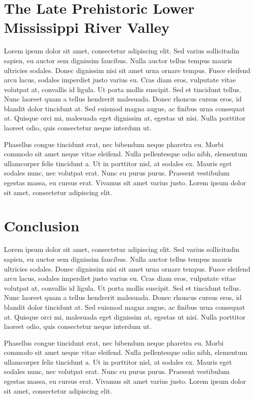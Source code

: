 \documentclass[article]{jss}
\begin{document}
\section{The Late Prehistoric Lower Mississippi River
Valley}\label{the-late-prehistoric-lower-mississippi-river-valley}

Lorem ipsum dolor sit amet, consectetur adipiscing elit. Sed varius
sollicitudin sapien, eu auctor sem dignissim faucibus. Nulla auctor
tellus tempus mauris ultricies sodales. Donec dignissim nisi sit amet
urna ornare tempus. Fusce eleifend arcu lacus, sodales imperdiet justo
varius eu. Cras diam eros, vulputate vitae volutpat at, convallis id
ligula. Ut porta mollis suscipit. Sed et tincidunt tellus. Nunc laoreet
quam a tellus hendrerit malesuada. Donec rhoncus cursus eros, id blandit
dolor tincidunt at. Sed euismod magna augue, ac finibus urna consequat
at. Quisque orci mi, malesuada eget dignissim at, egestas ut nisi. Nulla
porttitor laoreet odio, quis consectetur neque interdum ut.

Phasellus congue tincidunt erat, nec bibendum neque pharetra eu. Morbi
commodo sit amet neque vitae eleifend. Nulla pellentesque odio nibh,
elementum ullamcorper felis tincidunt a. Ut in porttitor nisl, at
sodales ex. Mauris eget sodales nunc, nec volutpat erat. Nunc eu purus
purus. Praesent vestibulum egestas massa, eu cursus erat. Vivamus sit
amet varius justo. Lorem ipsum dolor sit amet, consectetur adipiscing
elit.

\section{Conclusion}\label{conclusion}

Lorem ipsum dolor sit amet, consectetur adipiscing elit. Sed varius
sollicitudin sapien, eu auctor sem dignissim faucibus. Nulla auctor
tellus tempus mauris ultricies sodales. Donec dignissim nisi sit amet
urna ornare tempus. Fusce eleifend arcu lacus, sodales imperdiet justo
varius eu. Cras diam eros, vulputate vitae volutpat at, convallis id
ligula. Ut porta mollis suscipit. Sed et tincidunt tellus. Nunc laoreet
quam a tellus hendrerit malesuada. Donec rhoncus cursus eros, id blandit
dolor tincidunt at. Sed euismod magna augue, ac finibus urna consequat
at. Quisque orci mi, malesuada eget dignissim at, egestas ut nisi. Nulla
porttitor laoreet odio, quis consectetur neque interdum ut.

Phasellus congue tincidunt erat, nec bibendum neque pharetra eu. Morbi
commodo sit amet neque vitae eleifend. Nulla pellentesque odio nibh,
elementum ullamcorper felis tincidunt a. Ut in porttitor nisl, at
sodales ex. Mauris eget sodales nunc, nec volutpat erat. Nunc eu purus
purus. Praesent vestibulum egestas massa, eu cursus erat. Vivamus sit
amet varius justo. Lorem ipsum dolor sit amet, consectetur adipiscing
elit.
\end{document}
